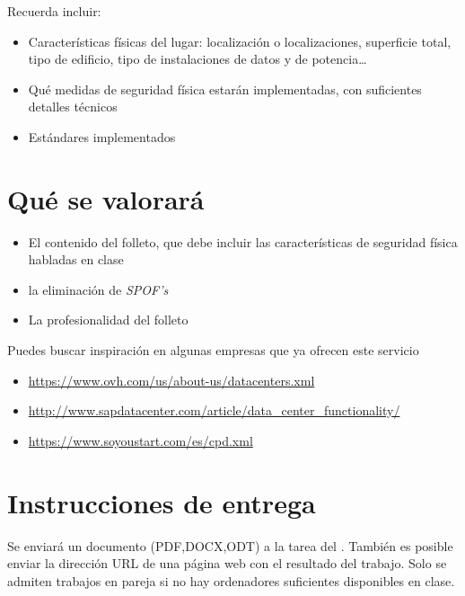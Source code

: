 Recuerda incluir:
\begin{itemize}
\item Características físicas del lugar: localización o localizaciones, superficie total, tipo de edificio, tipo de instalaciones de datos y de potencia…
\item Qué medidas de seguridad física estarán implementadas, con suficientes detalles técnicos
\item Estándares implementados
\end{itemize}

\section{Qué se valorará}
\begin{itemize}
\item El contenido del folleto, que debe incluir las características de seguridad física habladas en clase
\item la eliminación de \textit{SPOF's}
\item La profesionalidad del folleto
\end{itemize}

Puedes buscar inspiración en algunas empresas que ya ofrecen este servicio
\begin{itemize}
\item \url{https://www.ovh.com/us/about-us/datacenters.xml}
\item \url{http://www.sapdatacenter.com/article/data_center_functionality/}
\item \url{https://www.soyoustart.com/es/cpd.xml}
\end{itemize}

\section{Instrucciones de entrega}
Se enviará un documento (PDF,DOCX,ODT) a la tarea del .
También es posible enviar la dirección URL de una página web con el resultado del trabajo.
Solo se admiten trabajos en pareja si no hay ordenadores suficientes disponibles en clase.









